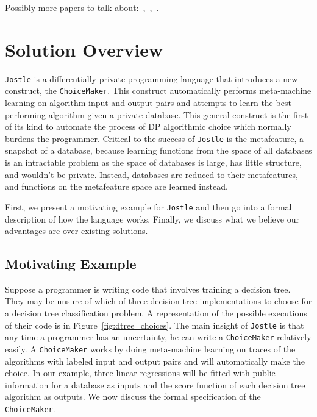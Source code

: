 \documentclass[11pt]{report}
\newcommand{\Jostle}{\texttt{Jostle}}
\renewcommand{\t}[1]{\texttt{#1}}
\begin{document}
Possibly more papers to talk about:~\cite{Winograd-Cort:2017},~\cite{Liu:2018},~\cite{Hsu:2014}.

\chapter{Solution Overview}\label{ch:solution}
\Jostle{} is a differentially-private programming language that introduces a new construct, the \t{ChoiceMaker}. This construct automatically performs meta-machine learning on algorithm input and output pairs and attempts to learn the best-performing algorithm given a private database. This general construct is the first of its kind to automate the process of DP algorithmic choice which normally burdens the programmer. Critical to the success of \Jostle{} is the metafeature, a snapshot of a database, because learning functions from the space of all databases is an intractable problem as the space of databases is large, has little structure, and wouldn't be private. Instead, databases are reduced to their metafeatures, and functions on the metafeature space are learned instead.

First, we present a motivating example for \Jostle{} and then go into a formal description of how the language works. Finally, we discuss what we believe our advantages are over existing solutions.
\section{Motivating Example}
Suppose a programmer is writing code that involves training a decision tree. They may be unsure of which of three decision tree implementations to choose for a decision tree classification problem. A representation of the possible executions of their code is in Figure~\ref{fig:dtree_choices}. The main insight of \Jostle{} is that any time a programmer has an uncertainty, he can write a \t{ChoiceMaker} relatively easily. A \t{ChoiceMaker} works by doing meta-machine learning on traces of the algorithms with labeled input and output pairs and will automatically make the choice. In our example, three linear regressions will be fitted with public information for a database as inputs and the score function of each decision tree algorithm as outputs. We now discuss the formal specification of the \t{ChoiceMaker}.
\end{document}
